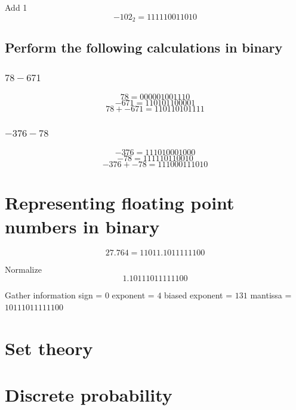 \documentclass[12pt]{article}
\begin{document}
Add 1
\[-102_2=111110011010\]

\subsection{Perform the following calculations in binary}
\subsubsection{$78-671$}
\[78=000001001110\]
\[-671=110101100001\]
\[78+-671=110110101111\]

\subsubsection{$-376-78$}
\[-376=111010001000\]
\[-78=111110110010\]
\[-376+-78=111000111010\]

\section{Representing floating point numbers in binary}

\[27.764 = 11011.1011111100\]

Normalize
\[1.10111011111100\]

Gather information
sign = $0$
exponent = $4$
biased exponent = $131$
mantissa = $10111011111100$

\section{Set theory}

\section{Discrete probability}
\end{document}

